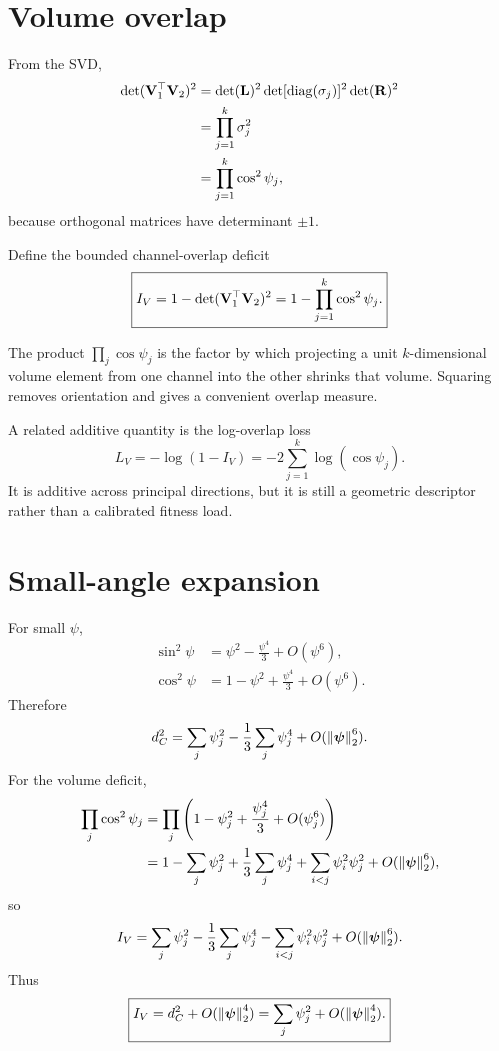 \section{Volume overlap}

From the SVD,
\begin{align}
\det(\mathbf{V}_1^\top\mathbf{V}_2)^2
&=\det(\mathbf L)^2
\det[\operatorname{diag}(\sigma_j)]^2
\det(\mathbf R)^2\\
&=\prod_{j=1}^k\sigma_j^2\\
&=\prod_{j=1}^k\cos^2\psi_j,
\end{align}
because orthogonal matrices have determinant \(\pm1\).

Define the bounded channel-overlap deficit
\begin{equation}
\boxed{
I_V=1-\det(\mathbf{V}_1^\top\mathbf{V}_2)^2
=1-\prod_{j=1}^k\cos^2\psi_j.}
\label{eq:volumeDeficit}
\end{equation}

\inwords The product \(\prod_j\cos\psi_j\) is the factor by which projecting a unit \(k\)-dimensional volume element from one channel into the other shrinks that volume. Squaring removes orientation and gives a convenient overlap measure.

A related additive quantity is the log-overlap loss
\begin{equation}
L_V=-\log(1-I_V)
=-2\sum_{j=1}^k\log(\cos\psi_j).
\label{eq:logOverlap}
\end{equation}
It is additive across principal directions, but it is still a geometric descriptor rather than a calibrated fitness load.

\section{Small-angle expansion}

For small \(\psi\),
\begin{align}
\sin^2\psi
&=\psi^2-\frac{\psi^4}{3}+O(\psi^6),\\
\cos^2\psi
&=1-\psi^2+\frac{\psi^4}{3}+O(\psi^6).
\end{align}
Therefore
\begin{equation}
d_C^2
=\sum_j\psi_j^2-\frac13\sum_j\psi_j^4+O(\left\lVert \boldsymbol{\psi}\right\rVert_2^6).
\label{eq:chordalExpansion}
\end{equation}
For the volume deficit,
\begin{align}
\prod_j\cos^2\psi_j
&=\prod_j\left(1-\psi_j^2+\frac{\psi_j^4}{3}+O(\psi_j^6)\right)\\
&=1-\sum_j\psi_j^2
+\frac13\sum_j\psi_j^4
+\sum_{i<j}\psi_i^2\psi_j^2
+O(\left\lVert \boldsymbol{\psi}\right\rVert_2^6),
\end{align}
so
\begin{equation}
I_V
=\sum_j\psi_j^2
-\frac13\sum_j\psi_j^4
-\sum_{i<j}\psi_i^2\psi_j^2
+O(\left\lVert \boldsymbol{\psi}\right\rVert_2^6).
\label{eq:volumeExpansion}
\end{equation}
Thus
\begin{equation}
\boxed{I_V=d_C^2+O(\left\lVert \boldsymbol{\psi}\right\rVert_2^4)
=\sum_j\psi_j^2+O(\left\lVert \boldsymbol{\psi}\right\rVert_2^4).}
\label{eq:overlapLocalEquivalence}
\end{equation}

